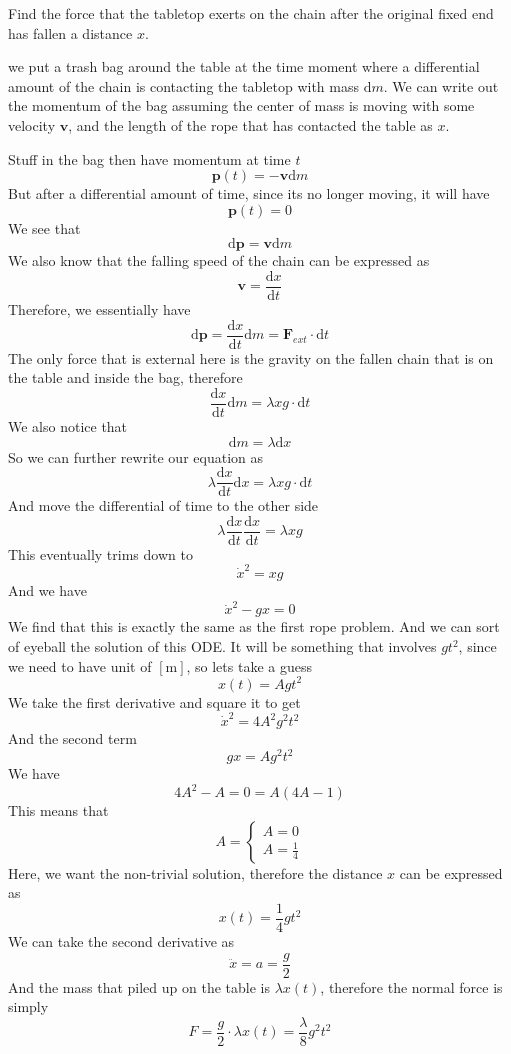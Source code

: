 \documentclass[11pt,letterpaper]{article}
\newcommand{\dydx}[2]{\frac{\text{d} #1}{\text{d} #2}}
\newcommand{\dfl}{\text{d}}
\begin{document}
Find the force that the tabletop exerts on the chain after the original fixed end has fallen a distance $x$.

we put a trash bag around the table at the time moment where a differential amount of the chain is contacting the tabletop with mass $\dfl m$. We can write out the momentum of the bag assuming the center of mass is moving with some velocity $\mathbf{v}$, and the length of the rope that has contacted the table as $x$.

Stuff in the bag then have momentum at time $t$
\[
\mathbf{p}(t) = -\mathbf{v}\dfl m
\]
But after a differential amount of time, since its no longer moving, it will have
\[
\mathbf{p}(t) = 0
\]
We see that
\[
\dfl \mathbf{p} = \mathbf{v}\dfl m
\]
We also know that the falling speed of the chain can be expressed as
\[
\mathbf{v} = \dydx{x}{t}
\]
Therefore, we essentially have
\[
\dfl \mathbf{p} = \dydx{x}{t}\dfl m = \mathbf{F}_{ext}\cdot \dfl t
\]
The only force that is external here is the gravity on the fallen chain that is on the table and inside the bag, therefore 
\[
\dydx{x}{t}\dfl m =\lambda xg \cdot \dfl t
\]
We also notice that 
\[
\dfl m = \lambda \dfl x
\]
So we can further rewrite our equation as
\[
\lambda\dydx{x}{t}\dfl x =\lambda xg \cdot \dfl t
\]
And move the differential of time to the other side
\[
\lambda \dydx{x}{t}\dydx{x}{t} = \lambda xg
\]
This eventually trims down to
\[
\dot{x}^2 = xg
\]
And we have
\[
\dot{x}^2 - gx = 0
\]
We find that this is exactly the same as the first rope problem. And we can sort of eyeball the solution of this ODE. It will be something that involves $gt^2$, since we need to have unit of $[\text{m}]$, so lets take a guess
\[
x(t) = Agt^2
\]
We take the first derivative and square it to get
\[
\dot{x}^2 = 4A^2g^2t^2
\]
And the second term
\[
gx = Ag^2t^2
\]
We have
\[
4A^2 - A = 0 = A(4A-1)
\]
This means that
\[
A = \begin{cases}
    A = 0\\
    A = \frac{1}{4}
\end{cases}
\]
Here, we want the non-trivial solution, therefore the distance $x$ can be expressed as
\[
x(t) = \frac{1}{4}gt^2
\]
We can take the second derivative as
\[
\ddot{x} = a = \frac{g}{2}
\]
And the mass that piled up on the table is $\lambda x(t)$, therefore the normal force is simply
\[
F = \frac{g}{2}\cdot \lambda x(t) = \frac{\lambda}{8}g^2t^2
\]
\end{document}

